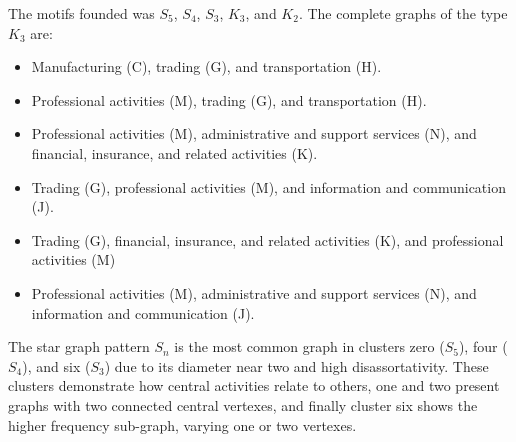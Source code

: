 \documentclass[12pt]{article}
\begin{document}
The motifs founded was $S_{5}$, $S_{4}$, $S_{3}$, $K_{3}$, and $K_{2}$. The complete graphs of the type $K_{3}$ are: 
\begin{itemize}
  \item Manufacturing (C), trading (G), and transportation (H).
  \item Professional activities (M), trading (G), and transportation (H).
  \item Professional activities (M), administrative and support services (N), and financial, insurance, and related activities (K).
  \item Trading (G), professional activities (M), and information and communication (J).
  \item Trading (G), financial, insurance, and related activities (K), and professional activities (M)
  \item Professional activities (M), administrative and support services (N), and information and communication (J).
\end{itemize}

The star graph pattern $S_{n}$ is the most common graph in clusters zero ($S_{5}$), four ($S_{4}$), and six ($S_{3}$) due to its diameter near two and high disassortativity. These clusters demonstrate how central activities relate to others, one and two present graphs with two connected central vertexes, and finally cluster six shows the higher frequency sub-graph, varying one or two vertexes.
\end{document}
